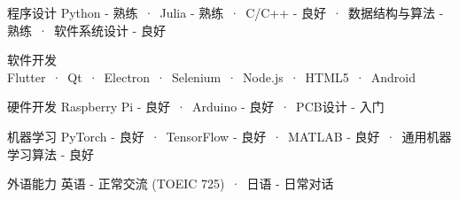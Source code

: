 

\begin{cvskills}
  \cvskill
    {程序设计} %
    {Python - 熟练\ ·\ Julia - 熟练\ ·\ C/C++ - 良好\ ·\ 数据结构与算法 - 熟练\ ·\ 软件系统设计 - 良好} %
    
  \cvskill
    {软件开发} %
    {Flutter\ ·\ Qt\ ·\ Electron\ ·\ Selenium\ ·\ Node.js\ ·\ HTML5\ ·\ Android} %

  \cvskill
    {硬件开发} %
    {Raspberry Pi - 良好\ ·\ Arduino - 良好\ ·\ PCB设计 - 入门} %

  \cvskill
    {机器学习} %
    {PyTorch - 良好\ ·\ TensorFlow - 良好\ ·\ MATLAB - 良好\ ·\ 通用机器学习算法 - 良好} %

    
  \cvskill
    {外语能力} %
    {英语 - 正常交流 (TOEIC 725)\ ·\ 日语 - 日常对话} %
    

\end{cvskills}